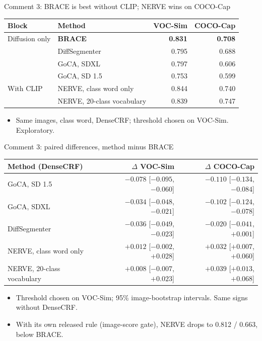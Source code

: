 \begin{frame}{Comment 3: BRACE is best without CLIP; NERVE wins on COCO-Cap}
\begin{slidetable}
\begin{tabular}{@{}llrr@{}}
\toprule
Block & Method & VOC-Sim & COCO-Cap \\
\midrule
Diffusion only & \textbf{BRACE} & \textbf{0.831} & \textbf{0.708} \\
 & DiffSegmenter & 0.795 & 0.688 \\
 & GoCA, SDXL & 0.797 & 0.606 \\
 & GoCA, SD 1.5 & 0.753 & 0.599 \\
\midrule
With CLIP & NERVE, class word only & 0.844 & 0.740 \\
 & NERVE, 20-class vocabulary & 0.839 & 0.747 \\
\bottomrule
\end{tabular}
\end{slidetable}
\begin{itemize}
\item Same images, class word, DenseCRF; threshold chosen on VOC-Sim. Exploratory.
\end{itemize}
\end{frame}

\begin{frame}{Comment 3: paired differences, method minus BRACE}
\begin{slidetable}
\begin{tabular}{@{}lrr@{}}
\toprule
Method (DenseCRF) & $\Delta$ VOC-Sim & $\Delta$ COCO-Cap \\
\midrule
GoCA, SD 1.5 & $-0.078$ [$-0.095$, $-0.060$] & $-0.110$ [$-0.134$, $-0.084$] \\
GoCA, SDXL & $-0.034$ [$-0.048$, $-0.021$] & $-0.102$ [$-0.124$, $-0.078$] \\
DiffSegmenter & $-0.036$ [$-0.049$, $-0.023$] & $-0.020$ [$-0.041$, $+0.001$] \\
NERVE, class word only & $+0.012$ [$-0.002$, $+0.028$] & $\mathbf{+0.032}$ [$+0.007$, $+0.060$] \\
NERVE, 20-class vocabulary & $+0.008$ [$-0.007$, $+0.023$] & $\mathbf{+0.039}$ [$+0.013$, $+0.068$] \\
\bottomrule
\end{tabular}
\end{slidetable}
\begin{itemize}
\item Threshold chosen on VOC-Sim; 95\% image-bootstrap intervals. Same signs without DenseCRF.
\item With its own released rule (image-score gate), NERVE drops to 0.812 / 0.663, below BRACE.
\end{itemize}
\end{frame}

